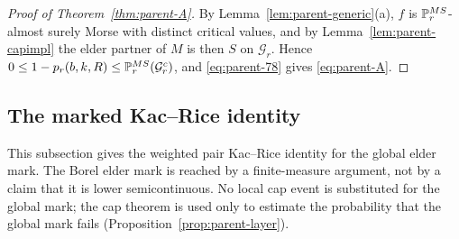 \begin{proof}[Proof of Theorem~\ref{thm:parent-A}]
By Lemma~\ref{lem:parent-generic}(a), $f$ is $\mathbb P^{MS}_r$-almost surely Morse with distinct critical values, and by Lemma~\ref{lem:parent-capimpl} the elder partner of $M$ is then $S$ on $\mathcal G_r$. Hence $0\le1-p_r(b,k,R)\le\mathbb P^{MS}_r(\mathcal G_r^c)$, and \eqref{eq:parent-78} gives \eqref{eq:parent-A}.
\end{proof}

\subsection{The marked Kac--Rice identity}\label{ssec:parent-KR}

This subsection gives the weighted pair Kac--Rice identity for the global elder mark. The Borel elder mark is reached by a finite-measure argument, not by a claim that it is lower semicontinuous. No local cap event is substituted for the global mark; the cap theorem is used only to estimate the probability that the global mark fails (Proposition~\ref{prop:parent-layer}).

